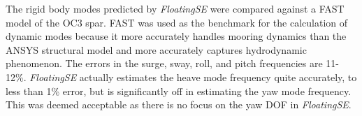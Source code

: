 The rigid body modes predicted by \textit{FloatingSE} were compared
against a FAST model of the OC3 spar.  FAST was used as the benchmark
for the calculation of dynamic modes because it more accurately handles mooring
dynamics than the ANSYS structural model and more accurately captures
hydrodynamic phenomenon.  The errors in the surge, sway, roll, and pitch
frequencies are 11-12\%.  \textit{FloatingSE} actually estimates the
heave mode frequency quite accurately, to less than 1\% error, but is
significantly off in estimating the yaw mode frequency.  This was deemed
acceptable as there is no focus on the yaw DOF in \textit{FloatingSE}.



